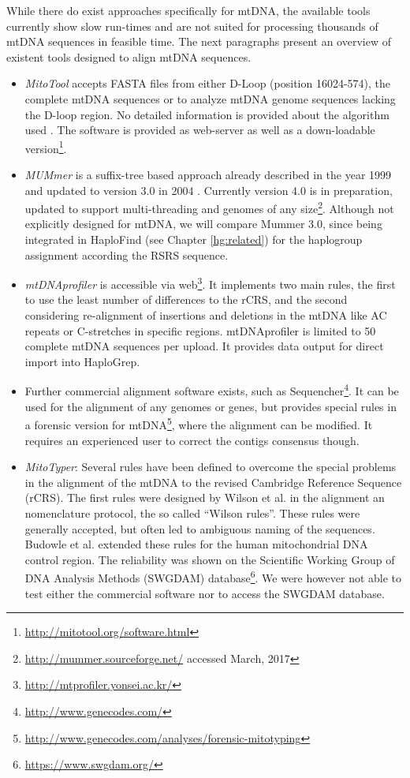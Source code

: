 While there do exist approaches specifically for mtDNA, the available tools currently show slow run-times and are not suited for processing thousands of mtDNA sequences in feasible time. The next paragraphs present an overview of existent tools designed to align mtDNA sequences.
\begin{itemize}
\item \textit{MitoTool} accepts FASTA files from either D-Loop (position 16024-574), the complete mtDNA sequences or to analyze mtDNA genome sequences lacking the D-loop region. No detailed information is provided about the algorithm used \cite{Fan2011,Fan2013}. The software is provided as web-server as well as a down-loadable version\footnote{\url{http://mitotool.org/software.html}}.
\item \textit{MUMmer} is a suffix-tree based approach already described in the year 1999 \cite{Delcher1999} and updated to version 3.0 in 2004 \cite{Kurtz2004}. Currently version 4.0 is in preparation, updated to support multi-threading and genomes of any size\footnote{\url{http://mummer.sourceforge.net/} accessed March, 2017}. Although not explicitly designed for mtDNA, we will compare Mummer 3.0, since being integrated in HaploFind (see Chapter \ref{hg:related}) for the haplogroup assignment according the RSRS sequence.
\item \textit{mtDNAprofiler} \cite{Yang2013} is accessible via web\footnote{\url{http://mtprofiler.yonsei.ac.kr/}}. It implements two main rules, the first to use the least number of differences to the rCRS, and the second considering re-alignment of insertions and deletions in the mtDNA like AC repeats or C-stretches in specific regions. mtDNAprofiler is limited to 50 complete mtDNA sequences per upload. It provides data output for direct import into HaploGrep.
\item Further commercial alignment software exists, such as Sequencher\footnote{\url{http://www.genecodes.com/}}. It can be used for the alignment of any genomes or genes, but provides special rules in a forensic version for mtDNA\footnote{\url{http://www.genecodes.com/analyses/forensic-mitotyping}}, where the alignment can be modified. It requires an experienced user to correct the contigs consensus though. 
\item \textit{MitoTyper}: Several rules have been defined to overcome the special problems in the alignment of the mtDNA to the revised Cambridge Reference Sequence (rCRS)\cite{Andrews1999}. The first rules were designed by Wilson et al. \cite{Wilson2002} in the alignment an nomenclature protocol, the so called “Wilson rules”. These rules were generally accepted, but often led to ambiguous naming of the sequences. Budowle et al. \cite{Budowle2010} extended these rules for the human mitochondrial DNA control region. The reliability was shown on the Scientific Working Group of DNA Analysis Methods (SWGDAM) database\footnote{\url{https://www.swgdam.org/}}. We were however not able to test either the commercial software nor to access the SWGDAM database. 

\end{itemize}
